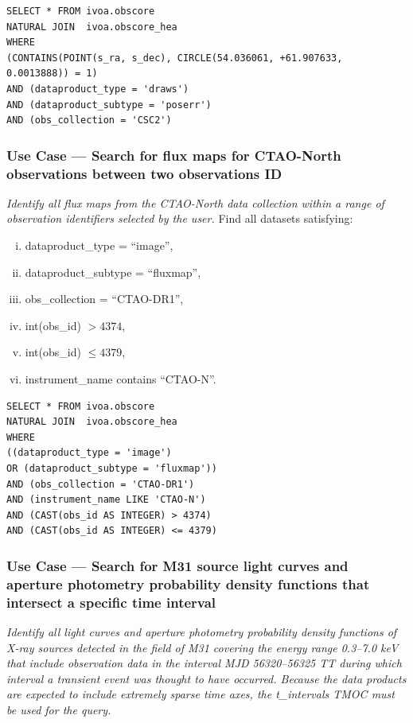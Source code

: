 \begin{verbatim}
SELECT * FROM ivoa.obscore
NATURAL JOIN  ivoa.obscore_hea
WHERE
(CONTAINS(POINT(s_ra, s_dec), CIRCLE(54.036061, +61.907633, 0.0013888)) = 1)
AND (dataproduct_type = 'draws')
AND (dataproduct_subtype = 'poserr')
AND (obs_collection = 'CSC2')
\end{verbatim}


\subsubsection{Use Case --- Search for flux maps for CTAO-North observations between two observations ID}

{\em Identify all flux maps from the CTAO-North data collection within a range of observation identifiers selected by the user.\/}
\medskip
\noindent Find all datasets satisfying:
\begin{enumerate}[(i)]
  \item dataproduct\_type = ``image'',
  \item dataproduct\_subtype = ``fluxmap'',
  \item obs\_collection = ``CTAO-DR1'',
  \item int(obs\_id) $> 4374$,
  \item int(obs\_id) $\leq 4379$,
  \item  instrument\_name contains ``CTAO-N''.
\end{enumerate}

\begin{verbatim}
SELECT * FROM ivoa.obscore
NATURAL JOIN  ivoa.obscore_hea
WHERE
((dataproduct_type = 'image')
OR (dataproduct_subtype = 'fluxmap'))
AND (obs_collection = 'CTAO-DR1')
AND (instrument_name LIKE 'CTAO-N')
AND (CAST(obs_id AS INTEGER) > 4374)
AND (CAST(obs_id AS INTEGER) <= 4379)
\end{verbatim}


\subsubsection{Use Case --- Search for M31 source light curves and aperture photometry probability density functions that intersect a specific time interval}

{\em Identify all light curves and aperture photometry probability density functions of X-ray sources detected in the field of M31 covering the energy range 0.3--7.0 keV that include observation data in the interval MJD 56320--56325 TT during which interval a transient event was thought to have occurred.  Because the data products are expected to include extremely sparse time axes, the t\_intervals TMOC must be used for the query.\/}

